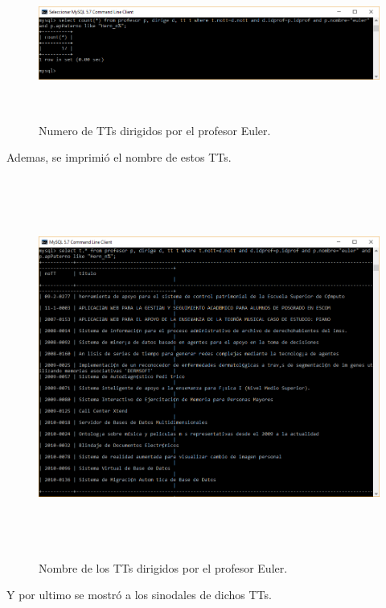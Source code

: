 \documentclass[12pt, titlepage]{article}
\begin{document}
	\begin{figure}[H]
		\begin{center}
			\includegraphics[width=16cm, height=5cm]{img/ultimo2.png}
			\caption{Numero de TTs dirigidos por el profesor Euler.} 
			\label{fig:ejercicio10}
		\end{center}
	\end{figure}
	Ademas, se imprimió el nombre de estos TTs.
	\begin{figure}[H]
		\begin{center}
			\includegraphics[width=16cm, height=12.5cm]{img/ultimo1.png}
			\caption{Nombre de los TTs dirigidos por el profesor Euler.} 
			\label{fig:ejercicio11}
		\end{center}
	\end{figure}
	Y por ultimo se mostró a los sinodales de dichos TTs.
\end{document}
